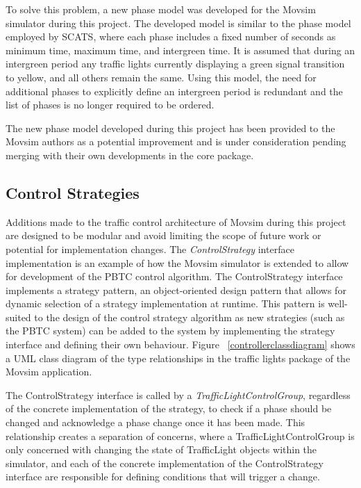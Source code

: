 To solve this problem, a new phase model was developed for the Movsim simulator during this project. The developed model is similar to the phase model employed by SCATS, where each phase includes a fixed number of seconds as minimum time, maximum time, and intergreen time. It is assumed that during an intergreen period any traffic lights currently displaying a green signal transition to yellow, and all others remain the same. Using this model, the need for additional phases to explicitly define an intergreen period is redundant and the list of phases is no longer required to be ordered.

The new phase model developed during this project has been provided to the Movsim authors as a potential improvement and is under consideration pending merging with their own developments in the core package. 

\subsection{Control Strategies}

Additions made to the traffic control architecture of Movsim during this project are designed to be modular and avoid limiting the scope of future work or potential for implementation changes. The \emph{ControlStrategy} interface implementation is an example of how the Movsim simulator is extended to allow for development of the PBTC control algorithm. The ControlStrategy interface implements a strategy pattern, an object-oriented design pattern that allows for dynamic selection of a strategy implementation at runtime. This pattern is well-suited to the design of the control strategy algorithm as new strategies (such as the PBTC system) can be added to the system by implementing the strategy interface and defining their own behaviour. Figure ~\ref{controllerclassdiagram} shows a UML class diagram of the type relationships in the traffic lights package of the Movsim application.

The ControlStrategy interface is called by a \emph{TrafficLightControlGroup}, regardless of the concrete implementation of the strategy, to check if a phase should be changed and acknowledge a phase change once it has been made. This relationship creates a separation of concerns, where a TrafficLightControlGroup is only concerned with changing the state of TrafficLight objects within the simulator, and each of the concrete implementation of the ControlStrategy interface are responsible for defining conditions that will trigger a change. 

